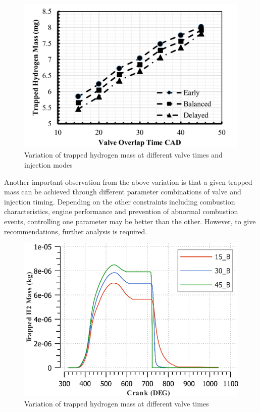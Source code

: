 \documentclass[conference]{IEEEtran}
\begin{document}
\begin{figure}[htbp]
    \centerline{\includegraphics{plots and graphs/3.png}}
    \caption{Variation of trapped hydrogen mass at different valve times and injection modes}
    \label{plt_3}
    \end{figure}

Another important observation from the above variation is that a given trapped mass can be achieved through different parameter combinations of valve and injection timing.
Depending on the other constraints including combustion characteristics, engine performance and prevention of abnormal combustion events, controlling one parameter may be better than the other.
However, to give recommendations, further analysis is required.

\begin{figure}[htbp]
    \centerline{\includegraphics{plots and graphs/4.png}}
    \caption{Variation of trapped hydrogen mass at different valve times}
    \label{plt_4}
    \end{figure}
\end{document}
